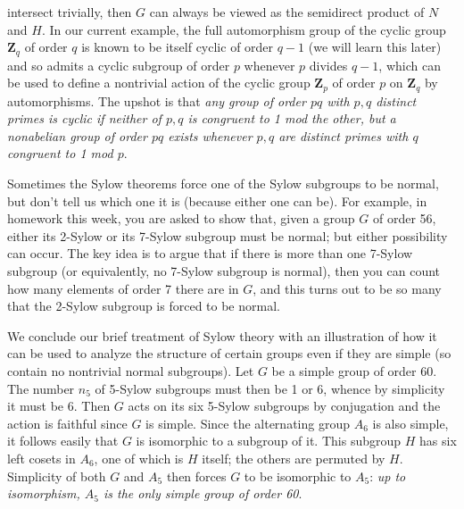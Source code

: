 \documentclass[10pt]{article} \usepackage{amsmath, amssymb}
\begin{document}
intersect trivially, then $G$ can always be viewed as the semidirect
product of $N$ and $H$. In our current example, the full automorphism
group of the cyclic group $\mathbf{Z}_q$ of order $q$ is known to be
itself cyclic of order $q-1$ (we will learn this later) and so admits a
cyclic subgroup of order $p$ whenever $p$ divides $q-1$, which can be
used to define a nontrivial action of the cyclic group $\mathbf{Z}_p$ of
order $p$ on $\mathbf{Z}_q$ by automorphisms. The upshot is that {\sl
  any group of order $pq$ with $p,q$ distinct primes is cyclic if
  neither of $p,q$ is congruent to 1 mod the other, but a nonabelian
  group of order $pq$ exists whenever $p,q$ are distinct primes with $q$
  congruent to 1 mod $p$}.

Sometimes the Sylow theorems force one of the Sylow subgroups to be
normal, but don't tell us which one it is (because either one can be).
For example, in homework this week, you are asked to show that, given a
group $G$ of order 56, either its 2-Sylow or its 7-Sylow subgroup must
be normal; but either possibility can occur. The key idea is to argue
that if there is more than one 7-Sylow subgroup (or equivalently, no
7-Sylow subgroup is normal), then you can count how many elements of
order 7 there are in $G$, and this turns out to be so many that the
2-Sylow subgroup is forced to be normal.

We conclude our brief treatment of Sylow theory with an illustration of
how it can be used to analyze the structure of certain groups even if
they are simple (so contain no nontrivial normal subgroups). Let $G$ be
a simple group of order 60. The number $n_5$ of 5-Sylow subgroups must
then be 1 or 6, whence by simplicity it must be 6. Then $G$ acts on its
six 5-Sylow subgroups by conjugation and the action is faithful since
$G$ is simple. Since the alternating group $A_6$ is also simple, it
follows easily that $G$ is isomorphic to a subgroup of it. This subgroup
$H$ has six left cosets in $A_6$, one of which is $H$ itself; the others
are permuted by $H$. Simplicity of both $G$ and $A_5$ then forces $G$ to
be isomorphic to $A_5$: {\sl up to isomorphism, $A_5$ is the only simple
  group of order 60}.
\end{document}
